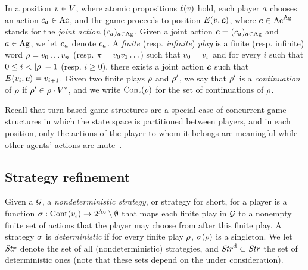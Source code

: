 
In a position $v\in V$, where atomic propositions $\ell(v)$
hold, each player $a$ chooses an action $c_a\in\textnormal{Ac}$, 
and the game proceeds to position
$E(v, \bm{c})$, where $\bm{c}\in \textnormal{Ac}^{\textnormal{Ag}}$ stands for the \emph{joint action}
$(c_a)_{a\in\textnormal{Ag}}$. Given a joint action
$\bm{c}=(c_a)_{a\in\textnormal{Ag}}$ and $a\in\textnormal{Ag}$, we let
$\bm{c}_{a}$ denote $c_a$.
A \emph{finite} (resp. \emph{infinite}) \emph{play} is a finite (resp. infinite)
word $\rho=v_{0}\ldots v_{n}$ (resp. $\pi=v_{0} v_{1}\ldots$)
such that $v_0=v_{\iota}$ and for every $i$ such that $0\leq i<|\fplay|-1$ (resp. $i\geq 0$), there exists a joint action $\bm{c}$
such that $E(v_{i}, \bm{c})=v_{i+1}$.
Given two finite plays $\rho$ and $\rho'$, we say that $\rho'$
is a \emph{continuation} of $\rho$ if $\rho'\in\rho\cdot
V^*$, and we write $\text{Cont}(\rho)$ for the set of
continuations of $\rho$.

\begin{remark}
  \label{rem-turn-based}
  Recall that turn-based game structures are a special case of
  concurrent game structures in which the state space is partitioned
  between players, and in each position, only the actions of the
  player to whom it belongs are meaningful while other agents' actions
  are mute~\cite{DBLP:journals/jacm/AlurHK02}.
\end{remark}

\subsection{Strategy refinement}
\label{sec-ndstrat}
Given a \CGS $\CGS$, a \emph{nondeterministic strategy}, or strategy
for short, for a player is a
function $\sigma:\text{Cont}(v_{\iota})\to 2^{\textnormal{Ac}}\setminus\emptyset$
that maps each finite play in $\CGS$ to a nonempty finite set of
actions that the player may choose from after this finite play.  A strategy $\sigma$ is
\emph{deterministic} if for every finite play $\rho$,
$\sigma(\rho)$ is a singleton.  We let $\mbox{\emph{Str}}$ denote the set of
all (nondeterministic) strategies, and $\mbox{\emph{Str}}^{\text{d}}\subset\mbox{\emph{Str}}$
the set of deterministic ones (note that these sets depend on the \CGS
under consideration).

